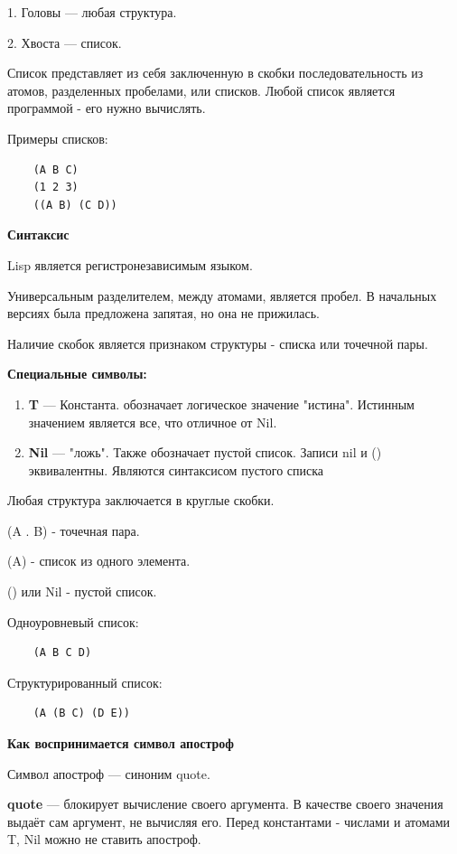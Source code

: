 1. Головы --- любая структура.

2. Хвоста --- список.

Список представляет из себя заключенную в скобки
последовательность из атомов, разделенных пробелами, или списков.
Любой список является программой - его нужно вычислять.

Примеры списков:
\begin{lstlisting}
	(A B C)
	(1 2 3)
	((A B) (C D))
\end{lstlisting}

\textbf{Синтаксис}

Lisp является регистронезависимым языком. 

Универсальным разделителем, между атомами, является пробел. В начальных версиях была предложена запятая, но она не прижилась.

Наличие скобок является признаком структуры - списка или точечной пары.

\textbf{Специальные символы:}
\begin{enumerate}
	\item \textbf{T} --- Константа. обозначает логическое значение "истина". Истинным значением является все, что отличное от Nil.
	\item \textbf{Nil} --- "ложь". Также обозначает пустой список. Записи nil и () эквивалентны. Являются синтаксисом пустого списка
\end{enumerate}

Любая структура заключается в круглые скобки.

(A . B) - точечная пара.

(A) - список из одного элемента.

() или Nil - пустой список.

Одноуровневый список:
\begin{lstlisting}
	(A B C D)
\end{lstlisting}

Структурированный список:
\begin{lstlisting}
	(A (B C) (D E))
\end{lstlisting}

\textbf{Как воспринимается символ апостроф}

Символ апостроф --- синоним quote.

\textbf{quote} --- блокирует вычисление своего аргумента.
В качестве своего значения выдаёт сам аргумент, не вычисляя его.
Перед константами - числами и атомами T, Nil можно не ставить апостроф.

